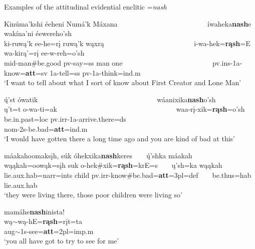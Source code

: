 \begin{exe}

\item\label{attitudinalenclitic} Examples of the attitudinal evidential enclitic =\textit{nash}

	\begin{xlist}
	
	\item\label{attitudinalenclitic1}
 	\glll Kinúma'kshi éeheni Numá'k Máxana ~ ~ ~ ~ ~ ~ ~ ~ ~ ~ ~ ~ ~ ~ ~ íwaheka\textbf{nash}e wakína'ni {ée}wereho'sh\\
	ki-ruwą'k ee-he=rį ruwą'k wąxrą ~ ~ ~ ~ ~ ~ ~ ~ ~ ~ ~ ~ ~ ~ ~   i-wa-hek=\textbf{rąsh}=E wa-kirą'=rį ee-w-reh=o'sh\\
	mid-\textnormal{man}\#\textnormal{be.good} pv-\textnormal{say}=ss \textnormal{man} \textnormal{one} ~ ~ ~ ~ ~ ~ ~ ~ ~ ~ ~ ~ ~ ~ ~  pv.ins-1a-\textnormal{know}=\textbf{att}=sv 1a-\textnormal{tell}=ss pv-1a-\textnormal{think}=ind.m\\
	\glt `I want to tell about what I sort of know about First Creator and Lone Man' \citep[1]{hollow1973a}

	\item\label{attitudinalenclitic2}
 	\glll ų́'st ówatik ~ ~ ~ ~ ~ ~ ~ ~ ~ ~ ~ ~ ~ ~ ~ ~ ~ ~ ~ ~ wáanixika\textbf{nash}o'sh\\
 	 ų't=t o-wa-ti=ak ~ ~ ~ ~ ~ ~ ~ ~ ~ ~ ~ ~ ~ ~ ~ ~ ~ ~ ~ ~ waa-rį-xik=\textbf{rąsh}=o'sh\\
 	 \textnormal{be.in.past}=loc pv.irr-1a-\textnormal{arrive.there}=ds ~ ~ ~ ~ ~ ~ ~ ~ ~ ~ ~ ~ ~ ~ ~ ~ ~ ~ ~ ~ nom-2s-\textnormal{be.bad}=\textbf{att}=ind.m\\
 	 \glt `I would have gotten there a long time ago and you are kind of bad at this' \citep[152]{hollow1973a}

	\item\label{attitudinalenclitic3}
	\glll máakahoomaksįh, súk óhekxika\textbf{nash}keres  ~ ~ ų́'shka máakah\\
	wąąkah=oowąk=sįh suk o-hek\#xik=\textbf{rąsh}=krE=s  ~ ~  ų'sh=ka wąąkah\\
	\textnormal{lie}.aux.hab=narr=ints \textnormal{child} pv.irr-\textnormal{know}\#\textnormal{be.bad}=\textbf{att}=3pl=def ~ ~  \textnormal{be.thus}=hab \textnormal{lie}.aux.hab\\
	\glt `they were living there, those poor children were living so' \citep[203]{hollow1973a}

	\item\label{attitudinalenclitic4}
	\glll mamáhe\textbf{nash}inista!\\
	wą$\sim$wą-hE=\textbf{rąsh}=rįt=ta\\
	aug$\sim$1s-\textnormal{see}=\textbf{att}=2pl=imp.m\\
	\glt `you all have got to try to see for me' \citep[35]{hollow1973a}


\end{xlist}
\end{exe}
